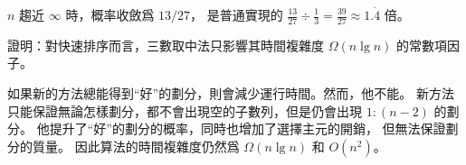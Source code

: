 $n$ 趨近 $\infty$ 時，概率收斂爲 $13/27$，
是普通實現的 $\frac{13}{27} \div \frac{1}{3} = \frac{39}{27} \approx 1.\dot{4}$ 倍。
\stopANSWER

\startigBase[a,continue]\startitem
證明：對快速排序而言，三數取中法只影響其時間複雜度 $\Omega(n\lg{n})$ 的常數項因子。
\stopitem\stopigBase

\startANSWER
如果新的方法總能得到“好”的劃分，則會減少運行時間。然而，他不能。
新方法只能保證無論怎樣劃分，都不會出現空的子數列，但是仍會出現 $1:(n-2)$ 的劃分。
他提升了“好”的劃分的概率，同時也增加了選擇主元的開銷，
但無法保證劃分的質量。
因此算法的時間複雜度仍然爲 $\Omega(n\lg{n})$ 和 $O(n^2)$。
\stopANSWER

\stopPROBLEM
